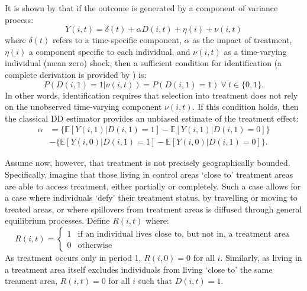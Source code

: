 \documentclass{article}
\begin{document}
\begin{spacing}{1.3}
It is shown by \citet{AshenfelterCard1985} that if the outcome is generated by
a component of variance process:
\begin{equation}
\label{Seqn:COV}
Y(i,t)=\delta(t) + \alpha D(i,t)+\eta(i)+\nu(i,t)
\end{equation}
where $\delta(t)$ refers to a time-specific component, $\alpha$ as the impact of 
treatment, $\eta(i)$ a component specific to each individual, and $\nu(i,t)$ as 
a time-varying individual (mean zero) shock, then a sufficient condition for 
identification (a complete derivation is provided by \citet{Abadie2005}) is:
\begin{equation}
\label{Seqn:ID}
P(D(i,1)=1|\nu(i,t))=P(D(i,1)=1) \ \forall\ t\in\{0,1\}.
\end{equation}
In other words, identification requires that selection into treatment does not
rely on the unobserved time-varying component $\nu(i,t)$.  If this condition 
holds, then the classical DD estimator provides an unbiased estimate of the
treatment effect:
\begin{equation}
\label{Seqn:DD}
\begin{split}
\alpha&=\{\mathbb{E}[Y(i,1)|D(i,1)=1]-\mathbb{E}[Y(i,1)|D(i,1)=0]\} \\
      &-\{\mathbb{E}[Y(i,0)|D(i,1)=1]-\mathbb{E}[Y(i,0)|D(i,1)=0]\}.
\end{split}
\end{equation}

Assume now, however, that treatment is not precisely geographically bounded.  
Specifically, imagine that those living in control areas `close to' treatment 
areas are able to access treatment, either partially or completely.  Such a 
case allows for a case where individuals `defy' their treatment status, by 
travelling or moving to treated areas, or where spillovers from treatment 
areas is diffused through general equilibrium processes.  Define $R(i,t)$ 
where:
\begin{equation}
\nonumber
 R(i,t) =
  \begin{cases}
   1   & \text{if an individual lives close to, but not in, a treatment area} \\
   0   & \text{otherwise} 
  \end{cases}
\end{equation}
As treatment occurs only in period 1, $R(i,0)=0$ for all $i$.  Similarly, as 
living in a treatment area itself excludes individuals from living `close to' 
the same treament area, $R(i,t)=0$ for all $i$ such that $D(i,t)=1$.


\end{spacing}
\end{document}
